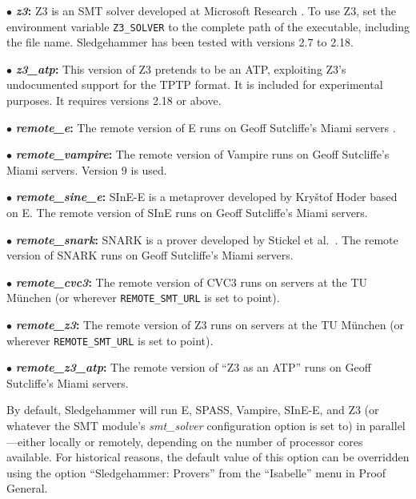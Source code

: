 \documentclass[a4paper,12pt]{article}
\begin{document}
\begin{enum}
\begin{enum}
\item[$\bullet$] \textbf{\textit{z3}:} Z3 is an SMT solver developed at
Microsoft Research \cite{z3}. To use Z3, set the environment variable
\texttt{Z3\_SOLVER} to the complete path of the executable, including the file
name. Sledgehammer has been tested with versions 2.7 to 2.18.

\item[$\bullet$] \textbf{\textit{z3\_atp}:} This version of Z3 pretends to be an
ATP, exploiting Z3's undocumented support for the TPTP format. It is included
for experimental purposes. It requires versions 2.18 or above.

\item[$\bullet$] \textbf{\textit{remote\_e}:} The remote version of E runs
on Geoff Sutcliffe's Miami servers \cite{sutcliffe-2000}.

\item[$\bullet$] \textbf{\textit{remote\_vampire}:} The remote version of
Vampire runs on Geoff Sutcliffe's Miami servers. Version 9 is used.

\item[$\bullet$] \textbf{\textit{remote\_sine\_e}:} SInE-E is a metaprover
developed by Kry\v stof Hoder \cite{sine} based on E. The remote version of
SInE runs on Geoff Sutcliffe's Miami servers.

\item[$\bullet$] \textbf{\textit{remote\_snark}:} SNARK is a prover
developed by Stickel et al.\ \cite{snark}. The remote version of
SNARK runs on Geoff Sutcliffe's Miami servers.

\item[$\bullet$] \textbf{\textit{remote\_cvc3}:} The remote version of CVC3 runs
on servers at the TU M\"unchen (or wherever \texttt{REMOTE\_SMT\_URL} is set to
point).

\item[$\bullet$] \textbf{\textit{remote\_z3}:} The remote version of Z3 runs on
servers at the TU M\"unchen (or wherever \texttt{REMOTE\_SMT\_URL} is set to
point).

\item[$\bullet$] \textbf{\textit{remote\_z3\_atp}:} The remote version of ``Z3
as an ATP'' runs on Geoff Sutcliffe's Miami servers.
\end{enum}

By default, Sledgehammer will run E, SPASS, Vampire, SInE-E, and Z3 (or whatever
the SMT module's \textit{smt\_solver} configuration option is set to) in
parallel---either locally or remotely, depending on the number of processor
cores available. For historical reasons, the default value of this option can be
overridden using the option ``Sledgehammer: Provers'' from the ``Isabelle'' menu
in Proof General.


\end{enum}
\end{document}
